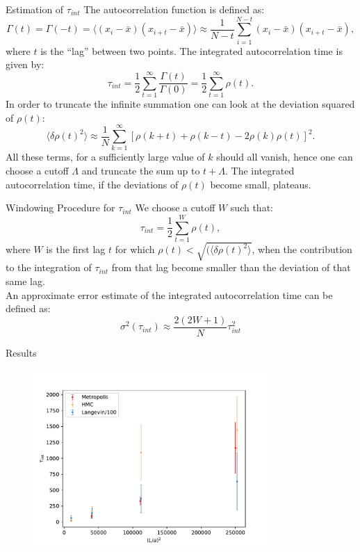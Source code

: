 \documentclass[10pt]{beamer}
\begin{document}
\begin{frame}{Estimation of $\tau_{int}$}
The autocorrelation function is defined as:
    \[
    \Gamma(t) = \Gamma(-t) = \langle (x_i - \bar x)(x_{i+t} - \bar x)\rangle \approx \frac{1}{N-t}\sum_{i=1}^{N-t}  (x_i - \bar x)(x_{i+t} - \bar x),
\] 
where $t$ is the ``lag'' between two points. The integrated autocorrelation time is given by:
\[
    \tau_{int} = \frac{1}{2} \sum_{t=1}^\infty \frac{\Gamma(t)}{\Gamma(0)} = \frac{1}{2} \sum_{t=1}^\infty \rho(t).
    \label{autocorr:inf}
\]
In order to truncate the infinite summation one can look at the deviation squared of $\rho(t)$:
\[
    \langle \delta \rho(t)^2\rangle \approx \frac{1}{N} \sum_{k=1}^\infty \left[ \rho(k+t) + \rho(k-t) - 2\rho(k)\rho(t)\right]^2.
\]
All these terms, for a sufficiently large value of $k$ should all vanish, hence one can choose a cutoff $\Lambda$ and truncate the sum up to $t+\Lambda$. The integrated autocorrelation time, if the deviations of $\rho(t)$ become small, plateaus.
\end{frame}

\begin{frame}{Windowing Procedure for $\tau_{int}$ }
We choose a cutoff $W$ such that:
\[
    \tau_{int} = \frac{1}{2} \sum_{t=1}^W \rho(t),
    \label{autocorr_time}
\]
where $W$ is the first lag $t$ for which $\rho(t) < \sqrt{ (\langle \delta \rho(t)^2\rangle}$, when the contribution to the integration of $\tau_{int}$ from that lag become smaller than the deviation of that same lag. \\
An approximate error estimate of the integrated autocorrelation time can be defined as:
\[
    \sigma^2(\tau_{int}) \approx \frac{2(2W+1)}{N}\tau_{int}^2
    \label{eq:tauint_error}
\]
\end{frame}

\begin{frame}{Results}
    \centering
    \begin{figure}
        \includegraphics[width=0.8\textwidth]{tau_ints.pdf}
    \end{figure}
\end{frame}
\end{document}

